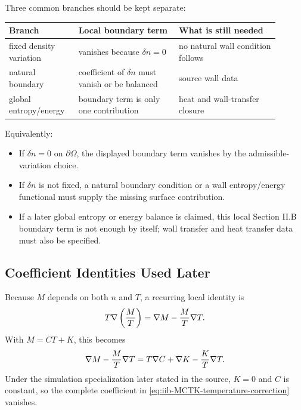 Three common branches should be kept separate:

\begin{center}
\begin{tabular}{@{}p{0.22\linewidth}p{0.34\linewidth}p{0.34\linewidth}@{}}
\toprule
Branch & Local boundary term & What is still needed \\
\midrule
fixed density variation & vanishes because \(\delta n=0\) & no natural wall condition follows \\
natural boundary & coefficient of \(\delta n\) must vanish or be balanced & source wall data \\
global entropy/energy & boundary term is only one contribution & heat and wall-transfer closure \\
\bottomrule
\end{tabular}
\end{center}

Equivalently:
\begin{itemize}
\item If \(\delta n=0\) on \(\partial\Omega\), the displayed boundary term
  vanishes by the admissible-variation choice.
\item If \(\delta n\) is not fixed, a natural boundary condition or a wall
  entropy/energy functional must supply the missing surface contribution.
\item If a later global entropy or energy balance is claimed, this local
  Section II.B boundary term is not enough by itself; wall transfer and heat
  transfer data must also be specified.
\end{itemize}

\subsection{Coefficient Identities Used Later}

Because \(M\) depends on both \(n\) and \(T\), a recurring local identity is
\begin{equation}
  T\nabla\left(\frac{M}{T}\right)
  =
  \nabla M-\frac{M}{T}\nabla T .
  \label{eq:iib-temperature-correction-identity}
\end{equation}
With \(M=CT+K\), this becomes
\begin{equation}
  \nabla M-\frac{M}{T}\nabla T
  =
  T\nabla C+\nabla K-\frac{K}{T}\nabla T .
  \label{eq:iib-MCTK-temperature-correction}
\end{equation}
Under the simulation specialization later stated in the source, \(K=0\) and
\(C\) is constant, so the complete coefficient in
\eqref{eq:iib-MCTK-temperature-correction} vanishes.

